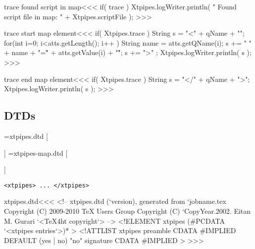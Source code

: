 \documentclass{article}
\begin{document}
{\<trace found script in map\><<<
if( trace ){
   Xtpipes.logWriter.println( " Found script file in map: "
                                + Xtpipes.scriptFile );
}
>>>


\<trace start map element\><<<
if( Xtpipes.trace ){
   String s =  "<" + qName + "\n";
   for(int i=0; i<atts.getLength(); i++ ){
      String name = atts.getQName(i);
      s += " " + name + "=\"" + atts.getValue(i) + "\"";
   }
   s += ">" ;
   Xtpipes.logWriter.println( s );
}
>>>

\<trace end map element\><<<
if( Xtpipes.trace ){
   String s =  "</" + qName + ">";
   Xtpipes.logWriter.println( s );
}
>>>



\subsection{DTDs}



\immediate{}=xtpipes.dtd
 \else
   \immediate{}
   [
     
   \EndHPage{}]
\fi
%
\immediate{}=xtpipes-map.dtd
 \else
   \immediate{}
   [
     
   \EndHPage{}]
\fi

\begin{verbatim}
<xtpipes> ... </xtpipes>
\end{verbatim}

\<xtpipes.dtd\><<<
<!-- xtpipes.dtd (`version), generated from `jobname.tex
     Copyright (C) 2009-2010 TeX Users Group
     Copyright (C) `CopyYear.2002. Eitan M. Gurari
`<TeX4ht copyright`> -->
<!ELEMENT xtpipes (#PCDATA `<xtpipes entries`>)* >
<!ATTLIST xtpipes
          preamble  CDATA #IMPLIED DEFAULT (yes | no) "no"
          signature CDATA #IMPLIED                         >
>>>


% 

}
\end{document}
